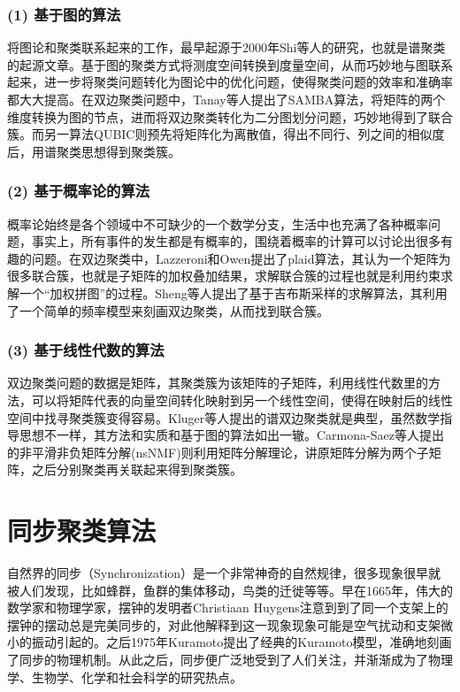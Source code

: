 \subsubsection*{(1) 基于图的算法}
将图论和聚类联系起来的工作，最早起源于2000年Shi等人的研究，也就是谱聚类的起源文章。基于图的聚类方式将测度空间转换到度量空间，从而巧妙地与图联系起来，进一步将聚类问题转化为图论中的优化问题，使得聚类问题的效率和准确率都大大提高。在双边聚类问题中，Tanay等人提出了SAMBA算法，将矩阵的两个维度转换为图的节点，进而将双边聚类转化为二分图划分问题，巧妙地得到了联合簇。而另一算法QUBIC则预先将矩阵化为离散值，得出不同行、列之间的相似度后，用谱聚类思想得到聚类簇。

\subsubsection*{(2) 基于概率论的算法}
概率论始终是各个领域中不可缺少的一个数学分支，生活中也充满了各种概率问题，事实上，所有事件的发生都是有概率的，围绕着概率的计算可以讨论出很多有趣的问题。在双边聚类中，Lazzeroni和Owen提出了plaid算法，其认为一个矩阵为很多联合簇，也就是子矩阵的加权叠加结果，求解联合簇的过程也就是利用约束求解一个“加权拼图”的过程。Sheng等人提出了基于吉布斯采样的求解算法，其利用了一个简单的频率模型来刻画双边聚类，从而找到联合簇。

\subsubsection*{(3) 基于线性代数的算法}
双边聚类问题的数据是矩阵，其聚类簇为该矩阵的子矩阵，利用线性代数里的方法，可以将矩阵代表的向量空间转化映射到另一个线性空间，使得在映射后的线性空间中找寻聚类簇变得容易。Kluger等人提出的谱双边聚类就是典型，虽然数学指导思想不一样，其方法和实质和基于图的算法如出一辙。Carmona-Saez等人提出的非平滑非负矩阵分解(nsNMF)则利用矩阵分解理论，讲原矩阵分解为两个子矩阵，之后分别聚类再关联起来得到聚类簇。


\section{同步聚类\Sync{}算法}
\label{sec:sync}
自然界的同步（Synchronization）是一个非常神奇的自然规律，很多现象很早就被人们发现，比如蜂群，鱼群的集体移动，鸟类的迁徙等等。早在1665年，伟大的数学家和物理学家，摆钟的发明者Christiaan Huygens注意到到了同一个支架上的摆钟的摆动总是完美同步的，对此他解释到这一现象现象可能是空气扰动和支架微小的振动引起的。之后1975年Kuramoto提出了经典的Kuramoto模型，准确地刻画了同步的物理机制。从此之后，同步便广泛地受到了人们关注，并渐渐成为了物理学、生物学、化学和社会科学的研究热点。

